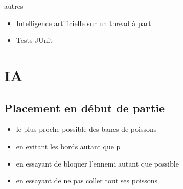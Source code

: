 \documentclass{beamer}
\begin{document}
\begin{frame}{}
\begin{block}{autres}
\begin{itemize}
\item<1-> Intelligence artificielle sur un thread à part
\item<2-> Tests JUnit
\end{itemize}
\end{block}
\end{frame}


\section{IA}

\subsection{Placement en début de partie}
\begin{frame}{}
\begin{block}{}
\begin{itemize}
 \item<1-> le plus proche possible des bancs de poissons
 \item<2-> en evitant les bords autant que p
 \item<3-> en essayant de bloquer l'ennemi autant que possible
 \item<4-> en essayant de ne pas coller tout ses poissons
\end{itemize}
\end{block}
\end{frame}
\end{document}
